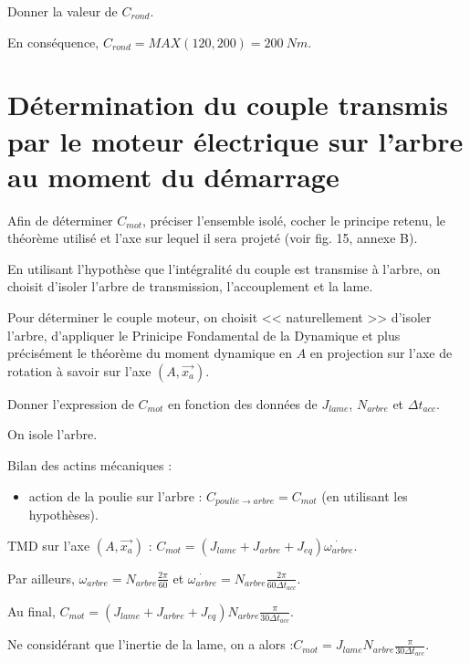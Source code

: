 \documentclass[11pt]{article}
\begin{document}
\UPSTIquestion Donner la valeur de $C_{rond}$.

\begin{UPSTIcorrige}
En conséquence, $C_{rond} = MAX(120,200) = \SI{200}{Nm}$. 
\end{UPSTIcorrige}

\section{Détermination du couple transmis par le moteur électrique sur l'arbre au moment du démarrage}

\UPSTIquestion* Afin de déterminer $C_{mot}$, préciser l'ensemble isolé, cocher le principe retenu, le théorème utilisé et l'axe sur lequel il sera projeté (voir fig. 15, annexe B). 

\begin{UPSTIcorrige}
En utilisant l'hypothèse que l’intégralité du couple est transmise à l'arbre, on choisit d'isoler l'arbre de transmission, l'accouplement et la lame. 

Pour déterminer le couple moteur, on choisit << naturellement >> d'isoler l'arbre, d'appliquer le Prinicipe Fondamental de la Dynamique et plus précisément le théorème du moment dynamique en $A$ en projection sur l'axe de rotation à savoir sur l'axe $\left(A,\overrightarrow{x_a}\right)$.
 \end{UPSTIcorrige}

\UPSTIquestion Donner l'expression de $C_{mot}$ en fonction des données de $J_{lame}$, $N_{arbre}$ et $\Delta t_{acc}$. 

\begin{UPSTIcorrige}
On isole l'arbre.

Bilan des actins mécaniques :
\begin{itemize}
\item action de la poulie sur l'arbre : $  C_{poulie\rightarrow arbre} = C_{mot}$ (en utilisant les hypothèses).
\end{itemize}

TMD sur l'axe $\left(A,\overrightarrow{x_a}\right)$ :
$  C_{mot} = \left(J_{lame}+J_{arbre}+J_{eq}\right) \dot{\omega_{arbre}}$.

Par ailleurs, $\omega_{arbre}  = N_{arbre} \frac{2\pi}{60}$ et  $\dot{\omega_{arbre}} = N_{arbre} \frac{2\pi}{60 \Delta t_{acc}}$.

Au final, $  C_{mot} = \left(J_{lame}+J_{arbre}+J_{eq}\right) N_{arbre} \frac{\pi}{30 \Delta t_{acc}}$.

Ne considérant que l'inertie de la lame, on a alors :$  C_{mot} = J_{lame} N_{arbre} \frac{\pi}{30 \Delta t_{acc}}$.
\end{UPSTIcorrige}
\end{document}
